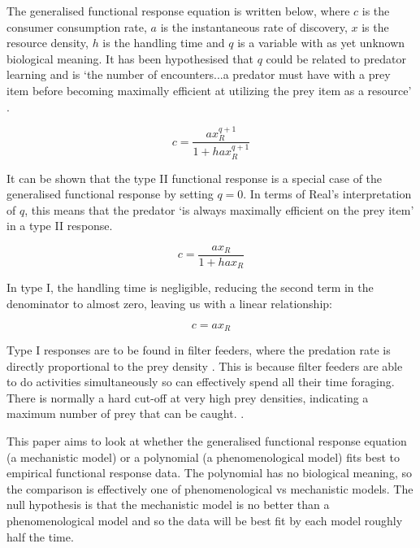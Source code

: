 \documentclass[11pt, a4paper, titlepage]{article}
\begin{document}
The generalised functional response equation is written below, where $c$ is the consumer consumption rate, $a$ is the instantaneous rate of discovery, $x$ is the resource density, $h$ is the handling time and $q$ is a variable with as yet unknown biological meaning. It has been hypothesised that $q$ could be related to predator learning and is `the number of encounters...a predator must have with a prey item before becoming maximally efficient at utilizing the prey item as a resource' \parencite{Real1977}.

\begin{equation}
c = \frac{ax_R^{q + 1}}{1 + hax_R^{q + 1}}
\end{equation}

\bigskip

It can be shown that the type II functional response is a special case of the generalised functional response by setting $q = 0$. In terms of Real's interpretation of $q$, this means that the predator `is always maximally efficient on the prey item'  \parencite{Real1977} in a type II response.

\begin{equation}
c = \frac{ax_R}{1 + hax_R}
\end{equation}

\bigskip

 In type I, the handling time is negligible, reducing the second term in the denominator to almost zero, leaving us with a linear relationship:

\begin{equation}
c = ax_R
\end{equation}

Type I responses are to be found in filter feeders, where the predation rate is directly  proportional to the prey density \parencite{Jeschke2004}. This is because filter feeders are able to do activities simultaneously so can effectively spend all their time foraging. There is normally a hard cut-off at very high prey densities, indicating a maximum number of prey that can be caught. \parencite{Jeschke2004}. 

This paper aims to look at whether the generalised functional response equation (a mechanistic model) or a polynomial (a phenomenological model) fits best to empirical functional response data. The polynomial has no biological meaning, so the comparison is effectively one of phenomenological vs mechanistic models. The null hypothesis is that the mechanistic model is no better than a phenomenological model and so the data will be best fit by each model roughly half the time.
\end{document}
